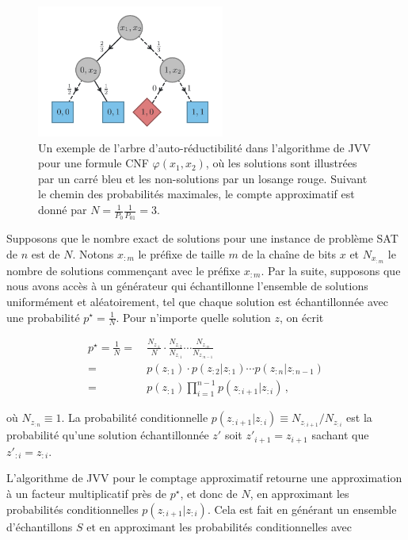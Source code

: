 \begin{figure}[h]
    \centering
    \includegraphics[width=0.55\textwidth]{figures/jvv-algorithm.pdf}
    \caption[Algorithme de Jerrum-Valiant-Vazirani]{Un exemple de l'arbre d'auto-réductibilité dans l'algorithme de JVV pour une formule CNF $\varphi(x_{1}, x_{2})$, où les solutions sont illustrées par un carré bleu et les non-solutions par un losange rouge. Suivant le chemin des probabilités maximales, le compte approximatif est donné par $N = \frac{1}{P_{0}} \frac{1}{P_{01}} = 3$.}
    \label{fig:algorithme-jvv}
\end{figure}

Supposons que le nombre exact de solutions pour une instance de problème SAT de $n$ est de $N$. Notons $x_{:m}$ le préfixe de taille $m$ de la chaîne de bits $x$ et $N_{x_{:m}}$ le nombre de solutions commençant avec le préfixe $x_{:m}$. Par la suite, supposons que nous avons accès à un générateur qui échantillonne l'ensemble de solutions uniformément et aléatoirement, tel que chaque solution est échantillonnée avec une probabilité $p^{\star} = \frac{1}{N}$. Pour n'importe quelle solution $z$, on écrit

\begin{align}
    p^\star = \frac1N =&{\ } \frac{N_{z_{:1}}}{N} \cdot \frac{N_{z_{:2}}}{N_{z_{:1}}} \cdots \frac{N_{z_{:n}}}{N_{z_{:n-1}}} \\
    =&{\ } p(z_{:1}) \cdot p(z_{:2}|z_{:1}) \cdots p(z_{:n}|z_{:n-1}) \\
    =&{\ } p(z_{:1}) \prod_{i=1}^{n-1} p(z_{:i+1}|z_{:i}) \,,
\end{align}

où $N_{z_{:n}} \equiv 1$. La probabilité conditionnelle $p(z_{:i+1}|z_{:i}) \equiv N_{z_{:i+1}} / N_{z_{:i}}$ est la probabilité qu'une solution échantillonnée $z'$ soit $z'_{i+1} = z_{i+1}$ sachant que $z'_{:i} = z_{:i}$.  

L'algorithme de JVV pour le comptage approximatif retourne une approximation à un facteur multiplicatif près de $p^{\star}$, et donc de $N$, en approximant les probabilités conditionnelles $p(z_{:i+1}|z_{:i})$. Cela est fait en générant un ensemble d'échantillons $S$ et en approximant les probabilités conditionnelles avec

